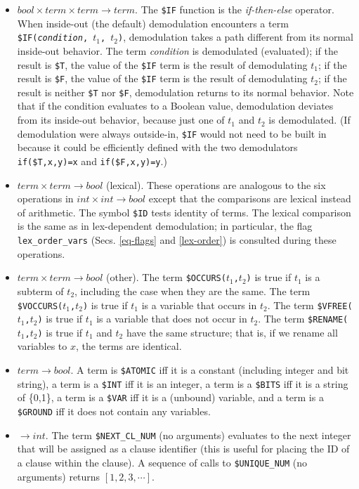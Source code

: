 \documentclass[11pt]{article}
\begin{document}
\begin{itemize}
\item
$bool \times term \times term \rightarrow term$.  The \verb:$IF:
function is the {\it if-then-else} operator.  When inside-out (the
default) demodulation encounters a term {\tt \$IF({\it condition},
$t_1$, $t_2$)}, demodulation takes a path different from its normal
inside-out behavior.  The term {\it condition} is demodulated
(evaluated); if the result is \verb:$T:, the value of the \verb:$IF:
term is the result of demodulating $t_1$; if the result is \verb:$F:,
the value of the \verb:$IF: term is the result of demodulating $t_2$;
if the result is neither \verb:$T: nor \verb:$F:, demodulation returns
to its normal behavior.  Note that if the condition evaluates to a
Boolean value, demodulation deviates from its inside-out behavior,
because just one of $t_1$ and $t_2$ is demodulated.  (If demodulation
were always outside-in, \verb:$IF: would not need to be built in because it
could be efficiently defined with the two demodulators
\verb:if($T,x,y)=x: and \verb:if($F,x,y)=y:.)

\item
$term \times term \rightarrow bool$ (lexical).
These operations are analogous to the six operations in $int \times int
\rightarrow bool$ except that the comparisons are lexical instead of
arithmetic.  The symbol \verb:$ID: tests identity of terms.
The lexical comparison is the same as in lex-dependent
demodulation; in particular, the flag \verb:lex_order_vars: (Secs.
\ref{eq-flags} and \ref{lex-order}) is consulted during these operations.

\item
$term \times term \rightarrow bool$ (other).
The term \texttt{\$OCCURS($t_1$,$t_2$)} is true if $t_1$ is a subterm of
$t_2$, including the case when they are the same.
The term \texttt{\$VOCCURS($t_1$,$t_2$)} is true if $t_1$ is a variable
that occurs in $t_2$.
The term \texttt{\$VFREE($t_1$,$t_2$)} is true if $t_1$ is a variable
that does not occur in $t_2$.
The term \texttt{\$RENAME($t_1$,$t_2$)} is true if $t_1$ and $t_2$
have the same structure; that is, if we rename all variables to
$x$, the terms are identical.

\item
$term \rightarrow bool$.
A term is \verb:$ATOMIC: iff it is a constant (including integer and
bit string),
a term is a \verb:$INT: iff it is an integer,
a term is a \verb:$BITS: iff it is a string of \{0,1\},
a term is a \verb:$VAR: iff it is a (unbound) variable, and
a term is a \verb:$GROUND: iff it does not contain any variables.

\item
$ \rightarrow int$.  The term \verb:$NEXT_CL_NUM: (no arguments)
evaluates to the next integer that will be assigned as a clause
identifier (this is useful for placing the ID of a clause within the
clause).  A sequence of calls to \verb:$UNIQUE_NUM: (no arguments)
returns $[1,2,3,\cdots]$.

\end{itemize}
\end{document}
